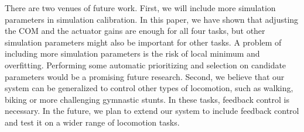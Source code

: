 There are two venues of future work. First, we will include more simulation parameters in simulation calibration. In this paper, we have shown that adjusting the COM and the actuator gains are enough for all four tasks, but other simulation parameters might also be important for other tasks. A problem of including more simulation parameters is the risk of local minimum and overfitting. Performing some automatic prioritizing and selection on candidate parameters would be a promising future research. Second, we believe that our system can be generalized to control other types of locomotion, such as walking, biking or more challenging gymnastic stunts. In these tasks, feedback control is necessary. In the future, we plan to extend our system to include feedback control and test it on a wider range of locomotion tasks.
